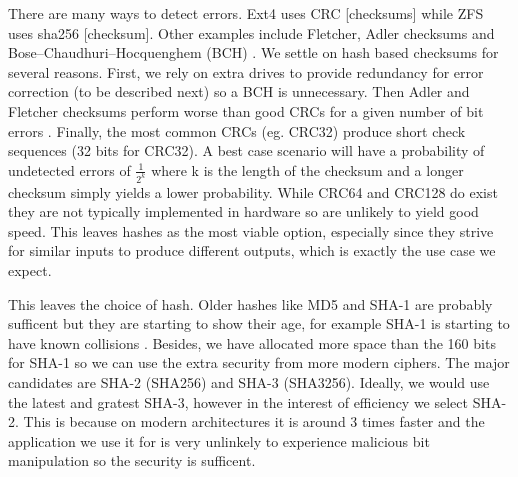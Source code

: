         There are many ways to detect errors. Ext4 uses CRC \cite{ext4_docs}[checksums]
        while ZFS uses sha256 \cite{ZFS_docs}[checksum]. Other examples include
        Fletcher, Adler checksums \cite{embedded_checksums} and
        Bose–Chaudhuri–Hocquenghem (BCH) \cite{flash_error_manual}. We settle
        on hash based checksums for several reasons. First, we rely on extra
        drives to provide redundancy for error correction (to be described
        next) so a BCH is unnecessary. Then Adler and Fletcher checksums
        perform worse than good CRCs for a given number of bit errors
        \citeauthor{embedded_checksums}. Finally, the most common CRCs (eg.
        CRC32) produce short check sequences (32 bits for CRC32). A best case
        scenario will have a probability of undetected errors of
        $\frac{1}{2^k}$
        where k is the length of the checksum \cite{embedded_checksums} and a
        longer checksum simply yields a lower probability. While CRC64 and
        CRC128 do exist they are not typically implemented in hardware so are
        unlikely to yield good speed. This leaves hashes as the most viable
        option, especially since they strive for similar inputs to produce
        different outputs, which is exactly the use case we expect.

        This leaves the choice of hash. Older hashes like MD5 and SHA-1 are
        probably sufficent but they are starting to show their age, for example
        SHA-1 is starting to have known collisions \cite{SHA_collision}.
        Besides, we have allocated more space than the 160 bits for SHA-1 so we
        can use the extra security from more modern ciphers. The major
        candidates are SHA-2 (SHA256) and SHA-3 (SHA3256). Ideally, we would
        use the latest and gratest SHA-3, however in the interest of efficiency
        we select SHA-2. This is because on modern architectures it is around 3
        times faster \cite{hash_stats} and the application we use it for is
        very unlinkely to experience malicious bit manipulation so the security
        is sufficent.


